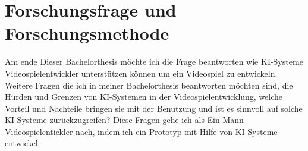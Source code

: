 \begin{comment}
Im Jahr 2022 hat die Firma OpenAI sein KI-Werkzeug ChatGPT der Öffentlichkeit zugänglich gemacht, und viele Berichte über einen Meilenstein in der KI-Forschung.
\\
ChatGPT kann selbständig durch eine für den Menschen einfache Prompt Schulaufgaben lösen oder sich mit dem Benutzer unterhalten.
\\
ChatGPT kann ganze Programme in verschiedenen Programmiersprachen Schreiben, was es davor nie in solchen Umfang da gewesen war.
\\
KI-Systeme bieten ein neues Gebiet um Forschung und Experimente zu betreiben, und ich möchte in meiner Bachelorthesis herausfinden ob es möglich ist, ein Videospiel mit hilfe von KI-Systemen zu entwickeln, so wie in der Pionierzeit wo einzelne Entwickler ganze Projekte erschaffen haben.
\\ 
Die Systeme, auf denen Videospiele liefen, wurden immer leistungsfähiger, und somit wurden auch lebendigere und komplexere Welten möglich. Videospiele wurden in der Regel nicht mehr von einer Person entwickelt, sondern von ganzen Studios. In diesen Studios werden Aufgaben auf Teams verteilt, wie zum Beispiel Concept Art and Design, Musik und Soundeffekte bis hin zum Vertrieb und Marketing.
\\
Kurz, ein Videospiel zu entwickeln ist schon sehr lange keine Ein-Mann-Aufgabe mehr, Und in solchen Teams kann jeder Videospielentwickler sich auf seine Stärken im Team konzentrieren.
\\
Ich sehe seit 2022 eine neue Möglichkeit Videospiele zu entwickeln, die zuvor in diesem Umfang nicht möglich gewesen war.
\\
KI-Systeme sind Werkzeuge, die ein hohes Potenzial beinhalten, um schnelles und qualitatives Arbeiten mit sich bringen.
\\
Mit Midjourney kann ich innerhalb von wenigen Minuten eine Landschaft erstellen lassen. ChatGPT kann dir Geschichten schreiben und Voice.ai dir eine neue Stimme verleihen. Das was die vorhin drei genannten KI-Systeme sich spezialisiert haben, sind in der realen
Welt, echte Berufe in der Gamingbranche - Concept Artist, narrative Designer / video game writer, voice actor.
\\
Es ist heute theoretisch möglich, ohne viele Vorkenntnisse diese Aufgaben mit Hilfe von KI-Systemen zu übernehmen.
Inhalt...
\end{comment}
\section{Forschungsfrage und Forschungsmethode}
Am ende Dieser Bachelorthesis möchte ich die Frage beantworten wie KI-Systeme Videospielentwickler unterstützen können um ein Videospiel zu entwickeln.
Weitere Fragen die ich in meiner Bachelorthesis beantworten möchten sind, die Hürden und Grenzen von KI-Systemen in der Videospielentwicklung, welche Vorteil und Nachteile bringen sie mit der Benutzung und ist es sinnvoll auf solche KI-Systeme zurückzugreifen?
Diese Fragen gehe ich als Ein-Mann-Videospielentickler nach, indem ich ein Prototyp mit Hilfe von KI-Systeme entwickel.
